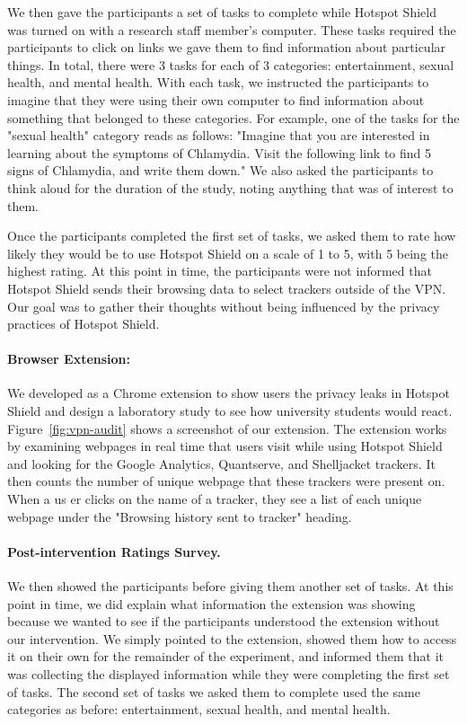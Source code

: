 We then gave the participants a set of tasks to complete while Hotspot Shield
was turned on with a research staff member's computer.  These tasks required
the participants to click on links we gave them to find information about
particular things.  In total, there were 3 tasks for each of 3 categories:
entertainment, sexual health, and mental health.  With each task, we
instructed the participants to imagine that they were using their own computer
to find information about something that belonged to these categories.  For
example, one of the tasks for the "sexual health" category reads as follows:
"Imagine that you are interested in learning about the symptoms of Chlamydia.
Visit the following link to find 5 signs of Chlamydia, and write them down."
We also asked the participants to think aloud for the duration of the study,
noting anything that was of interest to them.  

Once the participants completed the first set of tasks, we asked them to rate
how likely they would be to use Hotspot Shield on a scale of 1 to 5, with 5
being the highest rating.  At this point in time, the participants were not
informed that Hotspot Shield sends their browsing data to select trackers
outside of the VPN.  Our goal was to gather their thoughts without being
influenced by the privacy practices of Hotspot Shield.

\paragraph{Browser Extension: \tool}
We developed \tool as a Chrome extension to show users the privacy leaks
in Hotspot Shield and design a laboratory study to see how university students
would react.  Figure~\ref{fig:vpn-audit} shows a screenshot of our extension.
The extension works by examining webpages in real time that users visit while
using Hotspot Shield and looking for the Google Analytics, Quantserve, and
Shelljacket trackers.  It then counts the number of unique webpage that these
trackers were present on.  When a us er clicks on the name of a tracker, they
see a list of each unique webpage under the "Browsing history sent to tracker"
heading. 


\paragraph{Post-intervention Ratings Survey.}
We then showed the participants \tool before giving them another set of tasks.
At this point in time, we did explain what information the extension was showing because we wanted to see if the participants understood the extension without our intervention.
We simply pointed to the extension, showed them how to access it on their own for the remainder of the experiment, and informed them that it was collecting the displayed information while they were completing the first set of tasks.
The second set of tasks we asked them to complete used the same categories as before: entertainment, sexual health, and mental health.

